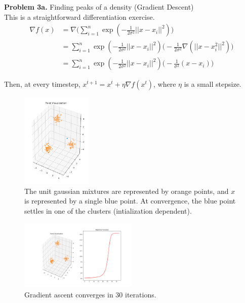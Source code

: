 \documentclass[a4paper]{article}
\begin{document}
\textbf{Problem 3a.} Finding peaks of a density (Gradient Descent) \\

This is a straightforward differentiation exercise.
\begin{align*}
    \nabla f(x) &= \nabla \Big( \sum_{i=1}^n \exp(-\frac{1}{2 \sigma^2} ||x - x_i||^2) \Big) \\
                &= \sum_{i=1}^n \exp(-\frac{1}{2 \sigma^2} ||x - x_i||^2) \Big(-\frac{1}{2 \sigma^2} \nabla (||x - x_i^2||^2) \Big) \\
                &= \sum_{i=1}^n \exp(-\frac{1}{2 \sigma^2} ||x - x_i||^2) \Big(-\frac{1}{\sigma^2} (x - x_i) \Big)
\end{align*}

Then, at every timestep, $x^{t+1} = x^t + \eta \nabla f(x^t)$, where $\eta$ is a small stepsize. \\
\begin{figure}[!h]
\centering
\includegraphics[width=0.3\textwidth]{cs395t_graphics_hw2_initial.png}
\caption{The unit gaussian mixtures are represented by orange points, and $x$ is represented by a single blue point. At convergence, the blue point settles in one of the clusters (intialization dependent).}
\end{figure}

\begin{figure}[!h]
\centering
\includegraphics[width=0.5\textwidth]{cs395t_graphics_hw2_gradient.png}
\caption{Gradient ascent converges in 30 iterations.}
\end{figure}
\end{document}
